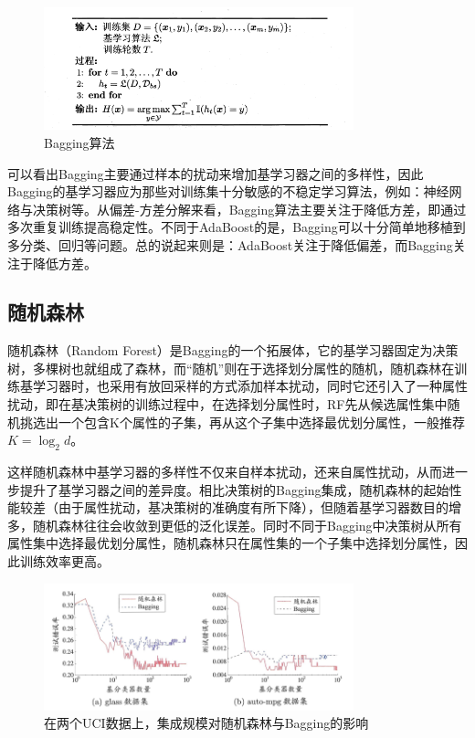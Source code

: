 \documentclass[12pt, a4paper]{article} %
\begin{document}
\begin{figure}[H]
    \centering
    \includegraphics[width=0.8\textwidth]{../img/8-4-Bagging算法.png}
    \caption{Bagging算法}
    \label{fig:Bagging算法}
\end{figure}

可以看出Bagging主要通过样本的扰动来增加基学习器之间的多样性，因此Bagging的基学习器应为那些对训练集十分敏感的不稳定学习算法，例如：神经网络与决策树等。从偏差-方差分解来看，Bagging算法主要关注于降低方差，即通过多次重复训练提高稳定性。不同于AdaBoost的是，Bagging可以十分简单地移植到多分类、回归等问题。总的说起来则是：AdaBoost关注于降低偏差，而Bagging关注于降低方差。

\subsection{随机森林}

随机森林（Random Forest）是Bagging的一个拓展体，它的基学习器固定为决策树，多棵树也就组成了森林，而“随机”则在于选择划分属性的随机，随机森林在训练基学习器时，也采用有放回采样的方式添加样本扰动，同时它还引入了一种属性扰动，即在基决策树的训练过程中，在选择划分属性时，RF先从候选属性集中随机挑选出一个包含K个属性的子集，再从这个子集中选择最优划分属性，一般推荐 $K = \log_2 d$。

这样随机森林中基学习器的多样性不仅来自样本扰动，还来自属性扰动，从而进一步提升了基学习器之间的差异度。相比决策树的Bagging集成，随机森林的起始性能较差（由于属性扰动，基决策树的准确度有所下降），但随着基学习器数目的增多，随机森林往往会收敛到更低的泛化误差。同时不同于Bagging中决策树从所有属性集中选择最优划分属性，随机森林只在属性集的一个子集中选择划分属性，因此训练效率更高。

\begin{figure}[H]
    \centering
    \includegraphics[width=0.8\textwidth]{../img/8-5-在两个UCI数据上，集成规模对随机森林与Bagging的影响.png}
    \caption{在两个UCI数据上，集成规模对随机森林与Bagging的影响}
    \label{fig:在两个UCI数据上，集成规模对随机森林与Bagging的影响}
\end{figure}
\end{document}
